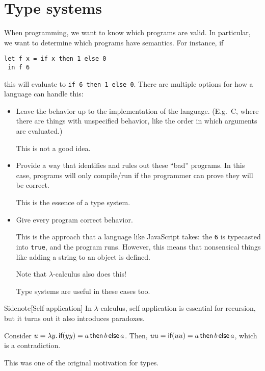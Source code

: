 \documentclass[class=scrartcl]{standalone}
\begin{document}
\section{Type systems}
When programming, we want to know which programs are valid.
In particular, we want to determine which programs have semantics.
For instance, if
\begin{verbatim}
let f x = if x then 1 else 0
 in f 6
\end{verbatim}
this will evaluate to \texttt{if 6 then 1 else 0}.
There are multiple options for how a language can handle this:
\begin{itemize}
  \item Leave the behavior up to the implementation of the language.
        (E.g.\ C, where there are things with unspecified behavior,
               like the order in which arguments are evaluated.)

        This is not a good idea.

  \item Provide a way that identifies and rules out these ``bad'' programs.
        In this case, programs will only compile/run if the programmer
        can prove they will be correct.

        This is the essence of a type system.

  \item Give every program correct behavior.
        
        This is the approach that a language like JavaScript takes:
        the \texttt{6} is typecasted into \texttt{true},
        and the program runs.
        However, this means that nonsensical things
        like adding a string to an object is defined.

        Note that \(\lambda\)-calculus also does this!

        Type systems are useful in these cases too.
\end{itemize}

\begin{adhoctheorem}{Sidenote}[Self-application]
  In \(\lambda\)-calculus, self application is essential for recursion,
  but it turns out it also introduces paradoxes.

  Consider \(u = \lambda y. \operatorname{\textsf{if}}(y y) = a\operatorname{\textsf{then}}b\operatorname{\textsf{else}}a\).
  Then, \(u u = \operatorname{\textsf{if}}(u u) = a\operatorname{\textsf{then}}b\operatorname{\textsf{else}}a\),
  which is a contradiction.

  This was one of the original motivation for types.
\end{adhoctheorem}
\end{document}
